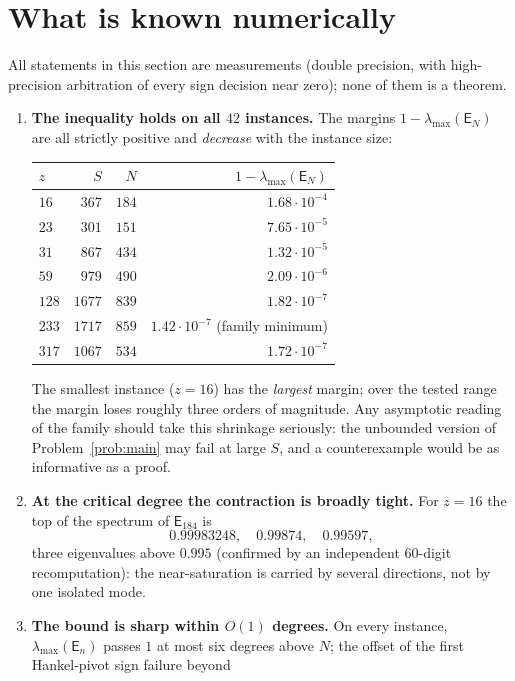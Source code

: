 \documentclass[11pt]{article}
\theoremstyle{remark}
\newcommand{\E}{\mathsf{E}}
\begin{document}
\section{What is known numerically}\label{sec:numerics}

All statements in this section are measurements (double precision,
with high-precision arbitration of every sign decision near zero);
none of them is a theorem.

\begin{enumerate}
\item \textbf{The inequality holds on all $42$ instances.}  The
margins $1-\lambda_{\max}(\E_{N})$ are all strictly positive and
\emph{decrease} with the instance size:
\begin{center}
\begin{tabular}{lrrr}
\toprule
$z$ & $S$ & $N$ & $1-\lambda_{\max}(\E_{N})$\\
\midrule
$16$  & $367$  & $184$ & $1.68\cdot10^{-4}$\\
$23$  & $301$  & $151$ & $7.65\cdot10^{-5}$\\
$31$  & $867$  & $434$ & $1.32\cdot10^{-5}$\\
$59$  & $979$  & $490$ & $2.09\cdot10^{-6}$\\
$128$ & $1677$ & $839$ & $1.82\cdot10^{-7}$\\
$233$ & $1717$ & $859$ & $1.42\cdot10^{-7}$ \quad(family minimum)\\
$317$ & $1067$ & $534$ & $1.72\cdot10^{-7}$\\
\bottomrule
\end{tabular}
\end{center}
The smallest instance ($z=16$) has the \emph{largest} margin; over the
tested range the margin loses roughly three orders of magnitude.  Any
asymptotic reading of the family should take this shrinkage seriously:
the unbounded version of Problem~\ref{prob:main} may fail at large
$S$, and a counterexample would be as informative as a proof.
\item \textbf{At the critical degree the contraction is broadly
tight.}  For $z=16$ the top of the spectrum of $\E_{184}$ is
\[
0.99983248,\quad 0.99874,\quad 0.99597,
\]
three eigenvalues above $0.995$ (confirmed by an independent
$60$-digit recomputation): the near-saturation is carried by several
directions, not by one isolated mode.
\item \textbf{The bound is sharp within $O(1)$ degrees.}  On every
instance, $\lambda_{\max}(\E_{n})$ passes $1$ at most six degrees
above $N$; the offset of the first Hankel-pivot sign failure beyond

\end{enumerate}
\end{document}
